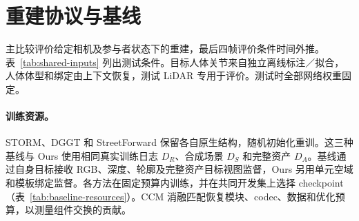 \section{重建协议与基线}
\label{sec:supp-protocol}

主比较评价给定相机及参与者状态下的重建，最后四帧评价条件时间外推。表~\ref{tab:shared-inputs} 列出测试条件。目标人体关节来自独立离线标注／拟合，人体体型和绑定由上下文恢复，测试 LiDAR 专用于评价。测试时全部网络权重固定。

\paragraph{训练资源。}
STORM、DGGT 和 StreetForward 保留各自原生结构，随机初始化重训。这三种基线与 Ours 使用相同真实训练日志 $D_R$、合成场景 $D_S$ 和完整资产 $D_A$。基线通过自身目标接收 RGB、深度、轮廓及完整资产目标视图监督，Ours 另用单元空域和模板绑定监督。各方法在固定预算内训练，并在共同开发集上选择 checkpoint（表~\ref{tab:baseline-resources}）。CCM 消融匹配恢复模块、codec、数据和优化预算，以测量组件交换的贡献。

